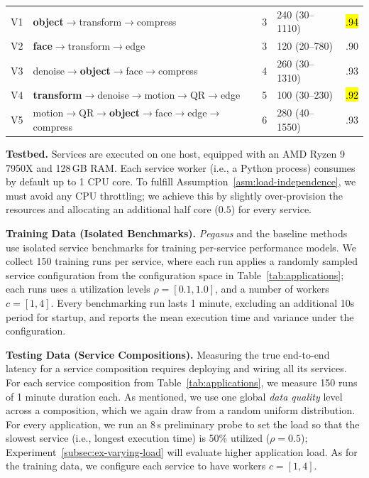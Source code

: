\begin{table}[t]
\begin{tabular}{@{}l l c | l c@{}}
        V1 & \textbf{object}$\to$transform$\to$compress & 3 & 240 (30--1110) & \hl{.94} \\
        V2 & \textbf{face}$\to$transform$\to$edge & 3 & 120 (20--780) & .90 \\
        V3 & denoise$\to$\textbf{object}$\to$face$\to$compress & 4 & 260 (30--1310) & .93 \\
        V4 & \textbf{transform}$\to$denoise$\to$motion$\to$QR$\to$edge & 5 & 100 (30--230) & \hl{.92} \\
        V5 & motion$\to$QR$\to$\textbf{object}$\to$face$\to$edge$\to$compress & 6 & 280 (40--1550) & .93 \\
        \bottomrule
    \end{tabular}
\end{table}



\vspace{3pt}
\noindent
\textbf{Testbed.} Services are executed on one host, equipped with an AMD Ryzen 9 7950X and 128\,GB RAM. Each service worker (i.e., a Python process) consumes by default up to 1 CPU core. To fulfill Assumption~\ref{asm:load-independence}, we must avoid any CPU throttling; we achieve this by slightly over-provision the resources and allocating an additional half core ($0.5$) for every service.

\vspace{3pt}
\noindent
\textbf{Training Data (Isolated Benchmarks).} \textit{Pegasus} and the baseline methods use isolated service benchmarks for training per-service performance models.
We collect 150 training runs per service, where each run applies a randomly sampled service configuration from the configuration space in Table~\ref{tab:applications}; each runs uses a utilization levels $\rho=[0.1,1.0]$, and a number of workers $c=[1,4]$.
Every benchmarking run lasts 1 minute, excluding an additional 10s period for startup, and reports the mean execution time and variance under the configuration.

\vspace{3pt}
\noindent
\textbf{Testing Data (Service Compositions).} 
%
Measuring the true end-to-end latency for a service composition requires deploying and wiring all its services. For each service composition from Table~\ref{tab:applications}, we measure 150 runs of 1 minute duration each. As mentioned, we use one global \textit{data quality} level across a composition, which we again draw from a random uniform distribution. For every application, we run an 8\,s preliminary probe to set the load so that the slowest service (i.e., longest execution time) is 50\% utilized ($\rho=0.5$); Experiment~\ref{subsec:ex-varying-load} will evaluate higher application load. As for the training data, we configure each service to have workers $c=[1,4]$.



